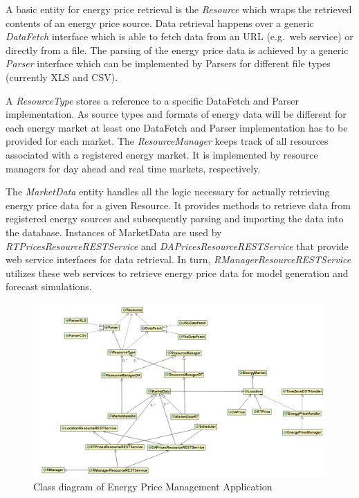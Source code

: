 A basic entity for energy price retrieval is the \textit{Resource} which wraps the retrieved contents of an energy price source. Data retrieval happens over a generic \textit{DataFetch} interface which is able to fetch data from an URL (e.g.~web service) or directly from a file. The parsing of the energy price data is achieved by a generic \textit{Parser} interface which can be implemented by Parsers for different file types (currently XLS and CSV). 

A \textit{ResourceType} stores a reference to a specific DataFetch and Parser implementation. As source types and formats of energy data will be different for each energy market at least one DataFetch and Parser implementation has to be provided for each market. The \textit{ResourceManager} keeps track of all resources associated with a registered energy market. It is implemented by resource managers for day ahead and real time markets, respectively. 

The \textit{MarketData} entity handles all the logic necessary for actually retrieving energy price data for a given Resource. It provides methods to retrieve data from registered energy sources and subsequently parsing and importing the data into the database. Instances of MarketData are used by \textit{RTPricesResourceRESTService} and \textit{DAPricesResourceRESTService} that provide web service interfaces for data retrieval. In turn, \textit{RManagerResourceRESTService} utilizes these web services to retrieve energy price data for model generation and forecast simulations. 

\begin{figure}[htbp]
	\hspace*{0.5in}
		\includegraphics[angle=90,width=\paperheight,height=\paperwidth,keepaspectratio=true]{figures/forecasting/EPMA_class_diagram.png}
	\caption{Class diagram of Energy Price Management Application}
	\label{fig:EPMA_class_diagram}
\end{figure}

